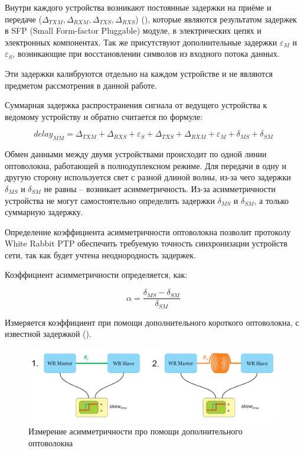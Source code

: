 Внутри каждого устройства возникают постоянные задержки на приёме и передаче ($ \Delta_{TXM},\Delta_{RXM},\Delta_{TXS},\Delta_{RXS} $)
(), которые являются результатом задержек в SFP (Small Form-factor Pluggable) 
модуле, в электрических цепях и электронных компонентах. Так же присутствуют дополнительные задержки  
$ \varepsilon_{M} $ и $ \varepsilon_{S} $, возникающие при восстановлении символов из входного потока данных.

Эти задержки калибруются отдельно на каждом устройстве и не являются предметом рассмотрения в данной работе.

Суммарная задержка распространения сигнала от ведущего устройства к ведомому устройству и обратно считается по формуле:

\begin{equation}
delay_{MM} = \Delta_{TXM} + \Delta_{RXS} + \varepsilon_{S} + \Delta_{TXS} + \Delta_{RXM} + \varepsilon_{M} + \delta_{MS} + \delta_{SM}
\end{equation}

Обмен данными между двумя устройствами происходит по одной линии оптоволокна, работающей в полнодуплексном режиме.
Для передачи в одну и другую сторону используется свет с разной длиной волны, из-за чего задержки $ \delta_{MS} $ и $ \delta_{SM} $ не равны --
возникает асимметричность. Из-за асимметричности устройства не могут самостоятельно определить задержки $ \delta_{MS} $ и $ \delta_{SM} $,
а только суммарную задержку.

Определение коэффициента асимметричности оптоволокна позволит протоколу White Rabbit PTP обеспечить требуемую точность синхронизации устройств сети,
так как будет учтена неоднородность задержек.

Коэффициент асимметричности определяется, как:

\begin{equation}
	\alpha = \frac{\delta_{MS} - \delta_{SM}}{\delta_{SM}}
\end{equation}

Измеряется коэффициент при помощи дополнительного короткого оптоволокна, с известной задержкой ().

\begin{figure}[ht!] 
	\center
	\includegraphics [scale=0.4] {my_folder/images//meas_scheme_1}
	\caption{Измерение асимметричности про помощи дополнительного оптоволокна} 
	\label{fig:meas-scheme-1}  
\end{figure}

